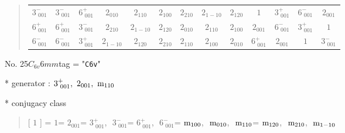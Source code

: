 \documentclass[fleqn,10pt,landscape]{jsarticle}
\begin{document}
\begin{quote}
\begin{tabular}{ccccccccccccc}
$ 3^{-}_{\,\,001} $ & $ 3^{-}_{\,\,001} $ & $ 6^{+}_{\,\,001} $ & $ 2{}_{010} $ & $ 2{}_{110} $ & $ 2{}_{100} $ & $ 2{}_{210} $ & $ 2{}_{1-10} $ & $ 2{}_{120} $ & $ 1 $ & $ 3^{+}_{\,\,001} $ & $ 6^{-}_{\,\,001} $ & $ 2{}_{001} $ \\
$ 6^{+}_{\,\,001} $ & $ 6^{+}_{\,\,001} $ & $ 3^{-}_{\,\,001} $ & $ 2{}_{210} $ & $ 2{}_{1-10} $ & $ 2{}_{120} $ & $ 2{}_{010} $ & $ 2{}_{110} $ & $ 2{}_{100} $ & $ 2{}_{001} $ & $ 6^{-}_{\,\,001} $ & $ 3^{+}_{\,\,001} $ & $ 1 $ \\
$ 6^{-}_{\,\,001} $ & $ 6^{-}_{\,\,001} $ & $ 3^{+}_{\,\,001} $ & $ 2{}_{1-10} $ & $ 2{}_{120} $ & $ 2{}_{210} $ & $ 2{}_{110} $ & $ 2{}_{100} $ & $ 2{}_{010} $ & $ 6^{+}_{\,\,001} $ & $ 2{}_{001} $ & $ 1 $ & $ 3^{-}_{\,\,001} $ \\
 \hline \hline
\end{tabular}
\end{quote}

\newpage

No. 25\quad$C_{6v}$\quad$6mm$\quad[ hexagonal ]
tag = "{\tt C6v}"

* generator : $3^{+}_{\,\,001},\,\,2{}_{001},\,\,{\rm m}_{110}$

* conjugacy class
\begin{quote}
[ $1$ ] = \quad $1$\newline[ $2{}_{001}$ ] = \quad $2{}_{001}$\newline[ $3^{+}_{\,\,001}$ ] = \quad $3^{+}_{\,\,001}$,\,\, $3^{-}_{\,\,001}$\newline[ $6^{+}_{\,\,001}$ ] = \quad $6^{+}_{\,\,001}$,\,\, $6^{-}_{\,\,001}$\newline[ ${\rm m}_{100}$ ] = \quad ${\rm m}_{100}$,\,\, ${\rm m}_{010}$,\,\, ${\rm m}_{110}$\newline[ ${\rm m}_{120}$ ] = \quad ${\rm m}_{120}$,\,\, ${\rm m}_{210}$,\,\, ${\rm m}_{1-10}$\newline
\end{quote}
\end{document}
